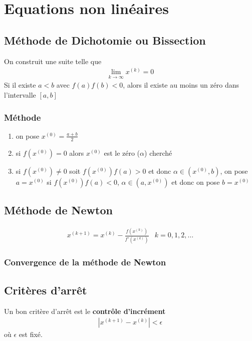 \chapter{Equations non linéaires}

\section{Méthode de Dichotomie ou Bissection}
On construit une suite telle que
\begin{eqnarray}
	\lim_{k\rightarrow\infty}x^{(k)}=0
\end{eqnarray}
Si il existe $a<b$ avec $f(a)f(b)<0$, alors il existe au moins un zéro dans l'intervalle $[a,b]$

\subsection{Méthode}
\begin{enumerate}
	\item on pose $x^{(0)}=\frac{a+b}{2}$
	\item si $f(x^{(0)})=0$ alors $x^{(0)}$ est le zéro ($\alpha$) cherché
	\item si $f(x^{(0)})\neq0$
	\subitem soit $f(x^{(0)})f(a)>0$ et donc $\alpha \in(x^{(0)},b)$, on pose $a=x^{(0)}$
	\subitem si $f(x^{(0)})f(a)<0$, $\alpha \in(a,x^{(0)})$ et donc on pose $b=x^{(0)}$
\end{enumerate}
\section{Méthode de Newton}

\begin{eqnarray}
	x^{(k+1)}=x^{(k)}-\frac{f(x^{(k)})}{f'(x^{(k)})} & k=0,1,2,\dots
\end{eqnarray}

\subsection{Convergence de la méthode de Newton}

\section{Critères d'arrêt}
Un bon critère d'arrêt est le \textbf{contrôle d'incrément}
\begin{eqnarray}
	|x^{(k+1)}-x^{(k)}|<\epsilon
\end{eqnarray}
où $\epsilon$ est fixé.

